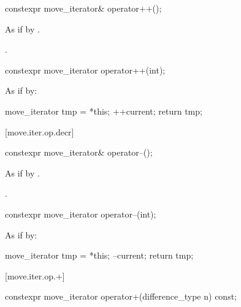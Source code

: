 %
\begin{itemdecl}
constexpr move_iterator& operator++();
\end{itemdecl}

\begin{itemdescr}
\pnum
\effects As if by .

\pnum
\returns {}.
\end{itemdescr}

%
\begin{itemdecl}
constexpr move_iterator operator++(int);
\end{itemdecl}

\begin{itemdescr}
\pnum
\effects
As if by:
\begin{codeblock}
move_iterator tmp = *this;
++current;
return tmp;
\end{codeblock}
\end{itemdescr}

[move.iter.op.decr]{}

%
\begin{itemdecl}
constexpr move_iterator& operator--();
\end{itemdecl}

\begin{itemdescr}
\pnum
\effects As if by .

\pnum
\returns {}.
\end{itemdescr}

%
\begin{itemdecl}
constexpr move_iterator operator--(int);
\end{itemdecl}

\begin{itemdescr}
\pnum
\effects
As if by:
\begin{codeblock}
move_iterator tmp = *this;
--current;
return tmp;
\end{codeblock}
\end{itemdescr}

[move.iter.op.+]{}

%
\begin{itemdecl}
constexpr move_iterator operator+(difference_type n) const;
\end{itemdecl}

